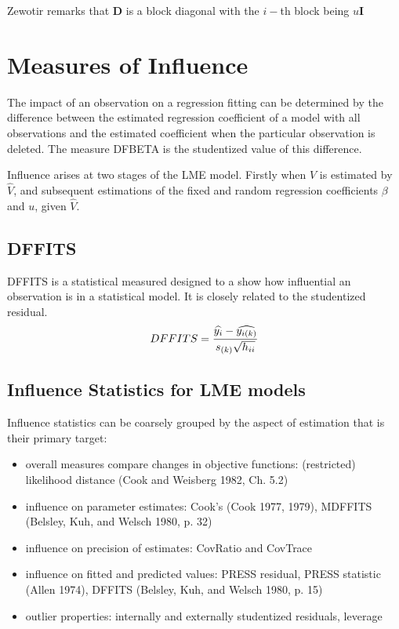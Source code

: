 \documentclass[Main.tex]{subfiles}
\begin{document}
	
	Zewotir remarks that $\boldsymbol{D}$ is a block diagonal with the $i-$th block being $u \boldsymbol{I}$
\section{Measures of Influence} %

The impact of an observation on a regression fitting can be determined by the difference between the estimated regression coefficient of a model with all observations and the estimated coefficient when the particular observation is deleted. The measure DFBETA is the studentized value of this difference.

Influence arises at two stages of the LME model. Firstly when $V$ is estimated by $\hat{V}$, and subsequent
estimations of the fixed and random regression coefficients $\beta$ and $u$, given $\hat{V}$.


\subsection{DFFITS} %
DFFITS is a statistical measured designed to a show how influential an observation is in a statistical model. It is closely related to the studentized residual.
\begin{displaymath} DFFITS = {\widehat{y_i} -
\widehat{y_{i(k)}} \over s_{(k)} \sqrt{h_{ii}}} \end{displaymath}


\subsection{Influence Statistics for LME models} %
Influence statistics can be coarsely grouped by the aspect of estimation that is their primary target:
\begin{itemize}
	\item overall measures compare changes in objective functions: (restricted) likelihood distance (Cook and Weisberg 1982, Ch. 5.2)
	\item influence on parameter estimates: Cook's  (Cook 1977, 1979), MDFFITS (Belsley, Kuh, and Welsch 1980, p. 32)
	\item influence on precision of estimates: CovRatio and CovTrace
	\item influence on fitted and predicted values: PRESS residual, PRESS statistic (Allen 1974), DFFITS (Belsley, Kuh, and Welsch 1980, p. 15)
	\item outlier properties: internally and externally studentized residuals, leverage
\end{itemize}
\end{document}
